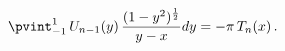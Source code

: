 \[\pvint_{-1}^{1}\mathop{U_{n-1}\/}\nolimits\!\left(y\right)\frac{(1-y^{2})^{%
\frac{1}{2}}}{y-x}dy=-\pi\mathop{T_{n}\/}\nolimits\!\left(x\right).\]
